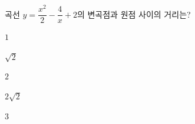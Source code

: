 곡선 $y=\dfrac{x^2}{2}-\dfrac{4}{x}+2$의 변곡점과 원점 사이의 거리는?
\begin{choices32}{\rule[-3ex]{0pt}{8ex}$1$}{\rule[-3ex]{0pt}{8ex}$\sqrt{2}$}{\rule[-3ex]{0pt}{8ex}$2$}{\rule[-3ex]{0pt}{8ex}$2\sqrt{2}$}{\rule[-3ex]{0pt}{8ex}$3$}\end{choices32}
